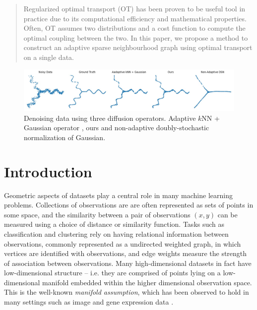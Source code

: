 \documentclass{article}
\begin{document}
\maketitle

\begin{abstract}
   Regularized optimal transport (OT) has been proven to be useful tool in practice due to its computational efficiency and mathematical properties. Often, OT assumes two distributions and a cost function to compute the optimal coupling between the two. In this paper, we propose a method to construct an adaptive sparse neighbourhood graph using optimal transport on a single data. 
\end{abstract}

\begin{figure}[h]
    \centering
    \includegraphics[width=1\textwidth]{LaTeX/figures/ToyMAGIC.jpg}
    \caption{Denoising data using three diffusion operators. Adaptive $k$NN + Gaussian operator \cite{van2018recovering}, ours and non-adaptive doubly-stochastic normalization of Gaussian.}
    \label{fig:ToyMAGIC}
\end{figure}


\section{Introduction}

Geometric aspects of datasets play a central role in many machine learning problems. 
Collections of observations are are often represented as sets of points in some space, and the similarity between a pair of observations $(x, y)$ can be measured using a choice of distance or similarity function. 
Tasks such as classification and clustering rely on having relational information between observations, commonly represented as a undirected weighted graph, in which vertices are identified with observations, and edge weights measure the strength of association between observations. 
Many high-dimensional datasets in fact have low-dimensional structure -- i.e. they are comprised of points lying on a low-dimensional manifold embedded within the higher dimensional observation space. This is the well-known \emph{manifold assumption}, which has been observed to hold in many settings such as image and gene expression data \cite{cayton2005algorithms, van2018recovering}. 
\end{document}
